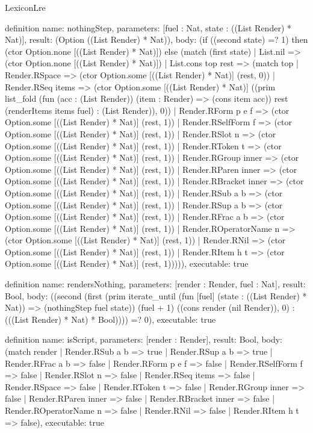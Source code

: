 \begin{lexlean}{LexiconLre}
\begin{semanticmodule}
definition{
  name: nothingStep,
  parameters: [fuel : Nat, state : ((List Render) * Nat)],
  result: (Option ((List Render) * Nat)),
  body: (if ((second state) =? 1) then (ctor Option.none [((List Render) * Nat)]) else (match (first state)
    | List.nil => (ctor Option.none [((List Render) * Nat)])
    | List.cons top rest => (match top
      | Render.RSpace => (ctor Option.some [((List Render) * Nat)] (rest, 0))
      | Render.RSeq items => (ctor Option.some [((List Render) * Nat)] ((prim list_fold (fun (acc : (List Render)) (item : Render) => (cons item acc)) rest (renderItems items fuel) : (List Render)), 0))
      | Render.RForm p e f => (ctor Option.some [((List Render) * Nat)] (rest, 1))
      | Render.RSelfForm f => (ctor Option.some [((List Render) * Nat)] (rest, 1))
      | Render.RSlot n => (ctor Option.some [((List Render) * Nat)] (rest, 1))
      | Render.RToken t => (ctor Option.some [((List Render) * Nat)] (rest, 1))
      | Render.RGroup inner => (ctor Option.some [((List Render) * Nat)] (rest, 1))
      | Render.RParen inner => (ctor Option.some [((List Render) * Nat)] (rest, 1))
      | Render.RBracket inner => (ctor Option.some [((List Render) * Nat)] (rest, 1))
      | Render.RSub a b => (ctor Option.some [((List Render) * Nat)] (rest, 1))
      | Render.RSup a b => (ctor Option.some [((List Render) * Nat)] (rest, 1))
      | Render.RFrac a b => (ctor Option.some [((List Render) * Nat)] (rest, 1))
      | Render.ROperatorName n => (ctor Option.some [((List Render) * Nat)] (rest, 1))
      | Render.RNil => (ctor Option.some [((List Render) * Nat)] (rest, 1))
      | Render.RItem h t => (ctor Option.some [((List Render) * Nat)] (rest, 1))))),
  executable: true
}

definition{
  name: rendersNothing,
  parameters: [render : Render, fuel : Nat],
  result: Bool,
  body: ((second (first (prim iterate_until (fun [fuel] (state : ((List Render) * Nat)) => (nothingStep fuel state)) (fuel + 1) ((cons render (nil Render)), 0) : (((List Render) * Nat) * Bool)))) =? 0),
  executable: true
}

definition{
  name: isScript,
  parameters: [render : Render],
  result: Bool,
  body: (match render
    | Render.RSub a b => true
    | Render.RSup a b => true
    | Render.RFrac a b => false
    | Render.RForm p e f => false
    | Render.RSelfForm f => false
    | Render.RSlot n => false
    | Render.RSeq items => false
    | Render.RSpace => false
    | Render.RToken t => false
    | Render.RGroup inner => false
    | Render.RParen inner => false
    | Render.RBracket inner => false
    | Render.ROperatorName n => false
    | Render.RNil => false
    | Render.RItem h t => false),
  executable: true
}


\end{semanticmodule}
\end{lexlean}
